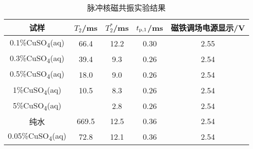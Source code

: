 \begin{table}[htbp!]
	\centering
	\caption{脉冲核磁共振实验结果}\label{tab:Pulse}	\begin{tabular}{c||c|c|c|c}
		\hline\hline
		试样 & $T_2$/ms & $T_2^*$/ms & $t_{\rm p,1}$/ms & 磁铁调场电源显示/V\\		\hline\hline
		0.1\%CuSO\textsubscript{4}(aq) & 66.4  & 12.2  & 0.30  & 2.55 \\		\hline
		0.3\%CuSO\textsubscript{4}(aq) & 39.4  & 9.3  & 0.26  & 2.54 \\		\hline
		0.5\%CuSO\textsubscript{4}(aq) & 18.0  & 9.0  & 0.26  & 2.54 \\		\hline
		1\%CuSO\textsubscript{4}(aq) & 10.5  & 8.3  & 0.26  & 2.54 \\		\hline
		5\%CuSO\textsubscript{4}(aq) &  & 2.8  & 0.26  & 2.54 \\		\hline
		纯水 & 669.5  & 12.5  & 0.36  & 2.54 \\		\hline
		0.05\%CuSO\textsubscript{4}(aq) & 72.8  & 12.1  & 0.36  & 2.54 \\		\hline\hline
	\end{tabular}
\end{table}